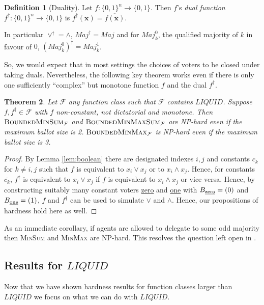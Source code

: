 \documentclass[11pt,a4paper, titlepage]{article}
\newtheorem{theorem}{Theorem}
\theoremstyle{definition}
\newtheorem{definition}[theorem]{Definition}
\let\vec\mathbf
\newcommand{\BMM}{\textsc{BoundedMinMax}}
\newcommand{\BMS}{\textsc{BoundedMinSum}}
\newcommand{\BMMS}{\textsc{BoundedMinMaxSum}}
\newcommand{\Maj}{\mathit{Maj}}
\newcommand{\LIQUID}{\mathit{LIQUID}}
\begin{document}
\begin{definition}[Duality]
    Let $f \colon \{0, 1\}^n \longrightarrow \{0, 1\}$. Then $f$'s \emph{dual function} $f^\dagger \colon \{0, 1\}^n \longrightarrow \{0, 1\}$ is $f^\dagger(\vec{x}) = \overline{f(\overline{\vec{x}})}$.
\end{definition}

In particular $\lor^\dagger = \land$, $\Maj^\dagger= \Maj$ and for $\Maj_k^0$, the qualified majority of $k$ in favour of $0$, $(\Maj_k^0)^\dagger = \Maj_k^1$.

So, we would expect that in most settings the choices of voters to be closed under taking duals.
Nevertheless, the following key theorem works even if there is only one sufficiently ``complex'' but monotone function $f$ and the dual $f^\dagger$.

\begin{theorem}
    Let $\mathcal{F}$ any function class such that $\mathcal{F}$ contains $\LIQUID$. Suppose $f, f^\dagger \in \mathcal{F}$ with $f$ non-constant, not dictatorial and monotone.
    Then $\BMS_\mathcal{F}$ and $\BMMS_\mathcal{F}$ are NP-hard even if the maximum ballot size is 2. $\BMM_{\mathcal{F}}$ is NP-hard even if the maximum ballot size is 3.
\end{theorem}

\begin{proof}
    By Lemma \ref{lem:boolean} there are designated indexes $i, j$ and constants $c_k$ for $k \neq i, j$ such that $f$ is equivalent to $x_i \lor x_j$ or to $x_i \land x_j$.
    Hence, for constants $\overline{c_k}$, $f^\dagger$ is equivalent to $x_i \lor x_j$ if $f$ is equivalent to $x_i \land x_j$ or vice versa.
    Hence, by constructing suitably many constant voters \underline{zero} and \underline{one} with $B_{\text{\underline{zero}}} = (0)$ and $B_{\text{\underline{one}}} = (1)$, $f$ and $f^\dagger$ can be used to simulate $\lor$ and $\land$.
    Hence, our propositions of hardness hold here as well.
\end{proof}

As an immediate corollary, if agents are allowed to delegate to some odd majority then \textsc{MinSum} and \textsc{MinMax} are NP-hard.
This resolves the question left open in \citet{grandi}.

\subsection{Results for $\LIQUID$}

Now that we have shown hardness results for function classes larger than $\LIQUID$ we focus on what we can do with $\LIQUID$.
\end{document}

